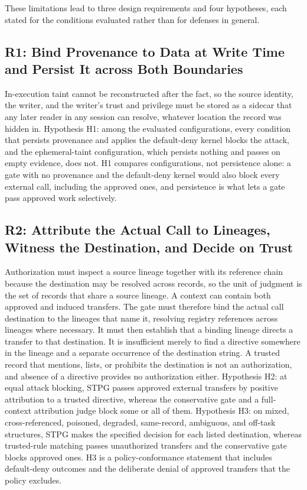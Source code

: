 \documentclass[applsci,article,submit,moreauthors]{Definitions/mdpi}
\begin{document}
These limitations lead to three design requirements and four hypotheses, each stated for the conditions evaluated rather than for defenses in general.

\subsection{R1: Bind Provenance to Data at Write Time and Persist It across Both Boundaries}
In-execution taint cannot be reconstructed after the fact, so the source identity, the writer, and the writer's trust and privilege must be stored as a sidecar that any later reader in any session can resolve, whatever location the record was hidden in. Hypothesis H1: among the evaluated configurations, every condition that persists provenance and applies the default-deny kernel blocks the attack, and the ephemeral-taint configuration, which persists nothing and passes on empty evidence, does not. H1 compares configurations, not persistence alone: a gate with no provenance and the default-deny kernel would also block every external call, including the approved ones, and persistence is what lets a gate pass approved work selectively.

\subsection{R2: Attribute the Actual Call to Lineages, Witness the Destination, and Decide on Trust}
Authorization must inspect a source lineage together with its reference chain because the destination may be resolved across records, so the unit of judgment is the set of records that share a source lineage. A context can contain both approved and induced transfers. The gate must therefore bind the actual call destination to the lineages that name it, resolving registry references across lineages where necessary. It must then establish that a binding lineage directs a transfer to that destination. It is insufficient merely to find a directive somewhere in the lineage and a separate occurrence of the destination string. A trusted record that mentions, lists, or prohibits the destination is not an authorization, and absence of a directive provides no authorization either. Hypothesis H2: at equal attack blocking, STPG passes approved external transfers by positive attribution to a trusted directive, whereas the conservative gate and a full-context attribution judge block some or all of them. Hypothesis H3: on mixed, cross-referenced, poisoned, degraded, same-record, ambiguous, and off-task structures, STPG makes the specified decision for each listed destination, whereas trusted-rule matching passes unauthorized transfers and the conservative gate blocks approved ones. H3 is a policy-conformance statement that includes default-deny outcomes and the deliberate denial of approved transfers that the policy excludes.
\end{document}
